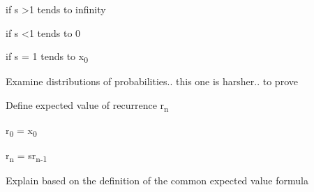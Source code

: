 \documentclass[12pt,reqno]{amsart}
\begin{document}
if s \textgreater 1 tends to infinity

if s \textless 1 tends to 0

if s = 1 tends to x\textsubscript{0}



Examine distributions of probabilities.. this one is harsher.. to prove



Define expected value of recurrence r\textsubscript{n}

r\textsubscript{0} = x\textsubscript{0}

r\textsubscript{n} = sr\textsubscript{n-1}

Explain based on the definition of the common expected value formula
\end{document}
